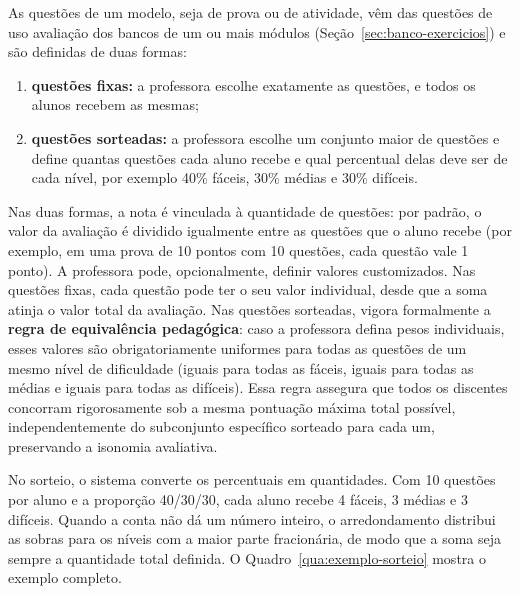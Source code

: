 As questões de um modelo, seja de prova ou de atividade, vêm das questões de uso avaliação dos bancos de um ou mais módulos (Seção~\ref{sec:banco-exercicios}) e são definidas de duas formas:

\begin{enumerate}
    \item \textbf{questões fixas:} a professora escolhe exatamente as questões, e todos os alunos recebem as mesmas;
    \item \textbf{questões sorteadas:} a professora escolhe um conjunto maior de questões e define quantas questões cada aluno recebe e qual percentual delas deve ser de cada nível, por exemplo 40\% fáceis, 30\% médias e 30\% difíceis.
\end{enumerate}

Nas duas formas, a nota é vinculada à quantidade de questões: por padrão, o valor da avaliação é dividido igualmente entre as questões que o aluno recebe (por exemplo, em uma prova de 10 pontos com 10 questões, cada questão vale 1 ponto). A professora pode, opcionalmente, definir valores customizados. Nas questões fixas, cada questão pode ter o seu valor individual, desde que a soma atinja o valor total da avaliação. Nas questões sorteadas, vigora formalmente a \textbf{regra de equivalência pedagógica}: caso a professora defina pesos individuais, esses valores são obrigatoriamente uniformes para todas as questões de um mesmo nível de dificuldade (iguais para todas as fáceis, iguais para todas as médias e iguais para todas as difíceis). Essa regra assegura que todos os discentes concorram rigorosamente sob a mesma pontuação máxima total possível, independentemente do subconjunto específico sorteado para cada um, preservando a isonomia avaliativa.

No sorteio, o sistema converte os percentuais em quantidades. Com 10 questões por aluno e a proporção 40/30/30, cada aluno recebe 4 fáceis, 3 médias e 3 difíceis. Quando a conta não dá um número inteiro, o arredondamento distribui as sobras para os níveis com a maior parte fracionária, de modo que a soma seja sempre a quantidade total definida. O Quadro~\ref{qua:exemplo-sorteio} mostra o exemplo completo.

